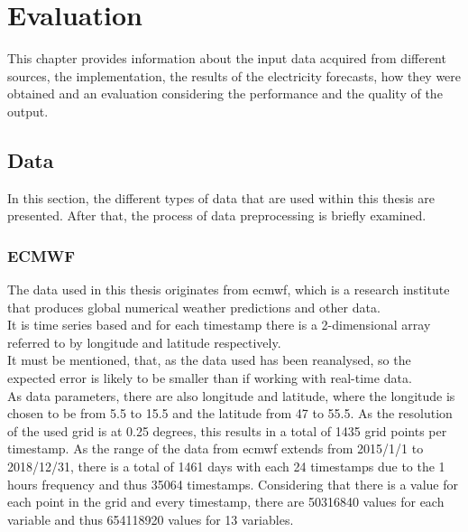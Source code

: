 \chapter{Evaluation}
\label{ch:Evaluation}

This chapter provides information about the input data acquired from different sources, the implementation, the results of the electricity forecasts, how they were obtained and an evaluation considering the performance and the quality of the output.\\


\section{Data}
\label{sec:data}

In this section, the different types of data that are used within this thesis are presented. After that, the process of data preprocessing is briefly examined.\\



\subsection{ECMWF}

The data used in this thesis originates from \gls{ecmwf}, which is a research institute that produces global numerical weather predictions and other data.\\
It is time series based and for each timestamp there is a 2-dimensional array referred to by longitude and latitude respectively.\\

It must be mentioned, that, as the data used has been reanalysed, so the expected error is likely to be smaller than if working with real-time data.\\

As data parameters, there are also longitude and latitude, where the longitude is chosen to be from 5.5 to 15.5 and the latitude from 47 to 55.5. As the resolution of the used grid is at 0.25 degrees, this results in a total of 1435 grid points per timestamp. As the range of the data from \gls{ecmwf} extends from 2015/1/1 to 2018/12/31, there is a total of 1461 days with each 24 timestamps due to the 1 hours frequency and thus 35064 timestamps. Considering that there is a value for each point in the grid and every timestamp, there are 50316840 values for each variable and thus 654118920 values for 13 variables.\\

